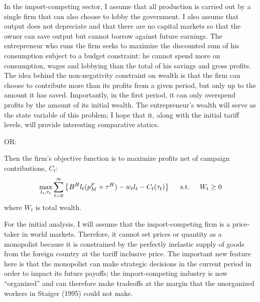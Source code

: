 \documentclass[12pt]{article}
\begin{document}
In the import-competing sector, I assume that all production is carried out by a single firm that can also choose to lobby the government. I also assume that output does not depreciate and that there are no capital markets so that the owner can save output but cannot borrow against future earnings. The entrepreneur who runs the firm seeks to maximize the discounted sum of his consumption subject to a budget constraint: he cannot spend more on consumption, wages and lobbying than the total of his savings and gross profits.
The idea behind the non-negativity constraint on wealth is that the firm can choose to contribute more than its profits from a given period, but only up to the amount it has saved. Importantly, in the first period, it can only overspend profits by the amount of its initial wealth. The entrepreneur's wealth will serve as the state variable of this problem; I hope that it, along with the initial tariff levels, will provide interesting comparative statics.

OR:

Then the firm's objective function is to maximize profits net of campaign contributions, $C_t$:
\[
  \max_{l_t,\tau_t} \sum_{t=0}^\infty \left\{B^H l_t(p_M^F + \tau^H) - w_t l_t - C_t(\tau_t) \right\} \hskip.2in \text{s.t.} \hskip.2in W_t \geq 0
\]
where $W_t$ is total wealth. 


For the initial analysis, I will assume that the import-competing firm is a price-taker in world markets. Therefore, it cannot set prices or quantity as a monopolist because it is constrained by the perfectly inelastic supply of goods from the foreign country at the tariff inclusive price. The important new feature here is that the monopolist can make strategic decisions in the current period in order to impact its future payoffs; the import-competing industry is now ``organized'' and can therefore make tradeoffs at the margin that the unorganized workers in Staiger (1995) could not make.
\end{document}
